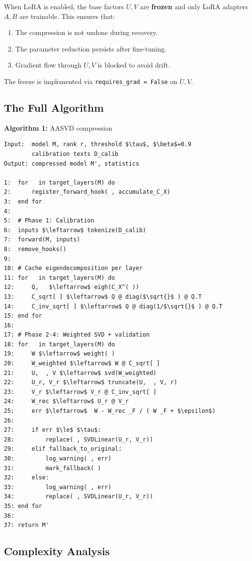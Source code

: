 When LoRA is enabled, the base factors $U, V$ are \textbf{frozen} and only LoRA 
adapters $A, B$ are trainable. This ensures that:

\begin{enumerate}
\item The compression is not undone during recovery.
\item The parameter reduction persists after fine-tuning.
\item Gradient flow through $U, V$ is blocked to avoid drift.

\end{enumerate}
The freeze is implemented via \texttt{requires\_grad = False} on $U, V$.

\subsection{The Full Algorithm}

\textbf{Algorithm 1:} AASVD compression
\begin{lstlisting}
Input:  model M, rank r, threshold $\tau$, $\beta$=0.9
        calibration texts D_calib
Output: compressed model M', statistics

1:  for   in target_layers(M) do
2:      register_forward_hook( , accumulate_C_X)
3:  end for
4:
5:  # Phase 1: Calibration
6:  inputs $\leftarrow$ tokenize(D_calib)
7:  forward(M, inputs)
8:  remove_hooks()
9:
10: # Cache eigendecomposition per layer
11: for   in target_layers(M) do
12:     Q,   $\leftarrow$ eigh(C_X^( ))
13:     C_sqrt[ ] $\leftarrow$ Q @ diag($\sqrt{}$ ) @ Q.T
14:     C_inv_sqrt[ ] $\leftarrow$ Q @ diag(1/$\sqrt{}$ ) @ Q.T
15: end for
16:
17: # Phase 2-4: Weighted SVD + validation
18: for   in target_layers(M) do
19:     W $\leftarrow$ weight( )
20:     W_weighted $\leftarrow$ W @ C_sqrt[ ]
21:     U,  , V $\leftarrow$ svd(W_weighted)
22:     U_r, V_r $\leftarrow$ truncate(U,  , V, r)
23:     V_r $\leftarrow$ V_r @ C_inv_sqrt[ ]
24:     W_rec $\leftarrow$ U_r @ V_r
25:     err $\leftarrow$  W - W_rec _F / ( W _F + $\epsilon$)
26:
27:     if err $\le$ $\tau$:
28:         replace( , SVDLinear(U_r, V_r))
29:     elif fallback_to_original:
30:         log_warning( , err)
31:         mark_fallback( )
32:     else:
33:         log_warning( , err)
34:         replace( , SVDLinear(U_r, V_r))
35: end for
36:
37: return M'
\end{lstlisting}

\subsection{Complexity Analysis}

